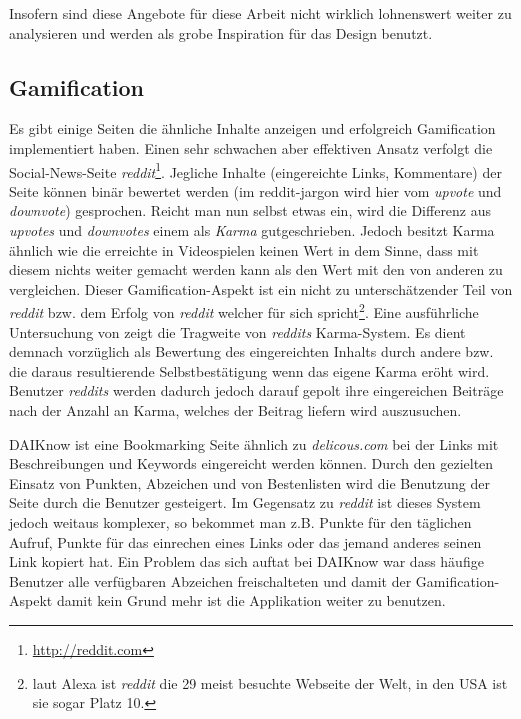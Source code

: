 \documentclass[12pt,twoside]{book}
\begin{document}
Insofern sind diese Angebote für diese Arbeit nicht wirklich lohnenswert weiter zu analysieren und werden als grobe Inspiration für das Design benutzt.

\subsection* {Gamification}

Es gibt einige Seiten die ähnliche Inhalte anzeigen und erfolgreich Gamification implementiert haben. Einen sehr schwachen aber effektiven Ansatz verfolgt die Social-News-Seite \textit{reddit}\footnote{\url{http://reddit.com}}. Jegliche Inhalte (eingereichte Links, Kommentare) der Seite können binär bewertet werden (im reddit-jargon wird hier vom \textit{upvote} und \textit{downvote}) gesprochen. Reicht man nun selbst etwas ein, wird die Differenz aus \textit{upvotes} und \textit{downvotes} einem als \textit{Karma} gutgeschrieben. Jedoch besitzt Karma ähnlich wie die erreichte in Videospielen keinen Wert in dem Sinne, dass mit diesem nichts weiter gemacht werden kann als den Wert mit den von anderen zu vergleichen.
Dieser Gamification-Aspekt ist ein nicht zu unterschätzender Teil von \textit{reddit} bzw. dem Erfolg von \textit{reddit} welcher für sich spricht\footnote{laut Alexa ist \textit{reddit} die 29 meist besuchte Webseite der Welt, in den USA ist sie sogar Platz 10.}.
Eine ausführliche Untersuchung von \citep{richterichkarma} zeigt die Tragweite von \textit{reddits} Karma-System. Es dient demnach vorzüglich als Bewertung des eingereichten Inhalts durch andere bzw. die daraus resultierende Selbstbestätigung wenn das eigene Karma eröht wird.
Benutzer \textit{reddits} werden dadurch jedoch darauf gepolt ihre eingereichen Beiträge nach der Anzahl an Karma, welches der Beitrag liefern wird auszusuchen.

DAIKnow \citep{meder2014daiknow} ist eine Bookmarking Seite ähnlich zu \textit{delicous.com} bei der Links mit Beschreibungen und Keywords eingereicht werden können. Durch den gezielten Einsatz von Punkten, Abzeichen und von Bestenlisten wird die Benutzung der Seite durch die Benutzer gesteigert. Im Gegensatz zu \textit{reddit} ist dieses System jedoch weitaus komplexer, so bekommet man z.B. Punkte für den täglichen Aufruf, Punkte für das einrechen eines Links oder das jemand anderes seinen Link kopiert hat.
Ein Problem das sich auftat bei DAIKnow war dass häufige Benutzer alle verfügbaren Abzeichen freischalteten und damit der Gamification-Aspekt damit kein Grund mehr ist die Applikation weiter zu benutzen.
\end{document}
